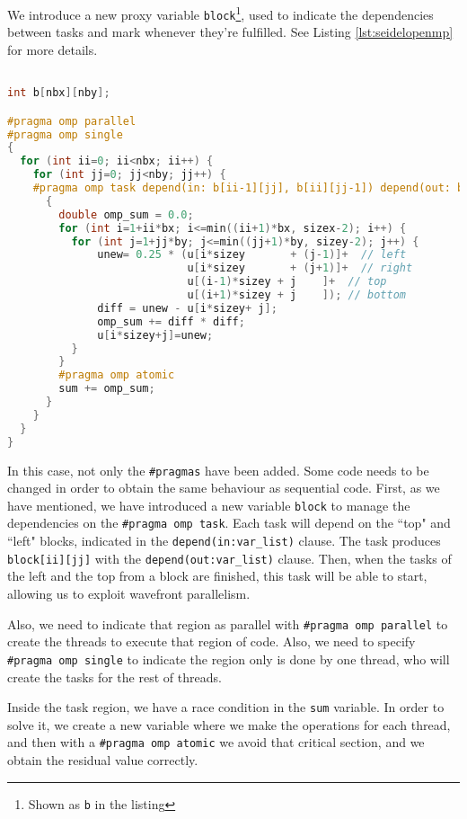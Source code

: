 \documentclass[a4paper, 10pt]{article}
\begin{document}
We introduce a new proxy variable \texttt{block}\footnote{Shown as \texttt{b} in the listing}, used to indicate the dependencies between tasks and mark whenever they're fulfilled. See Listing \ref{lst:seidelopenmp} for more details.

\begin{lstlisting}[language=c, caption={OpenMP pragma for Gauss-Seidel parallelization}, label={lst:seidelopenmp}]

int b[nbx][nby];

#pragma omp parallel
#pragma omp single
{
  for (int ii=0; ii<nbx; ii++) {
    for (int jj=0; jj<nby; jj++) {
    #pragma omp task depend(in: b[ii-1][jj], b[ii][jj-1]) depend(out: b[ii][jj]) private(diff, unew) 
      {
        double omp_sum = 0.0;
        for (int i=1+ii*bx; i<=min((ii+1)*bx, sizex-2); i++) {
          for (int j=1+jj*by; j<=min((jj+1)*by, sizey-2); j++) {
              unew= 0.25 * (u[i*sizey	    + (j-1)]+  // left
                            u[i*sizey	    + (j+1)]+  // right
                            u[(i-1)*sizey + j    ]+  // top
                            u[(i+1)*sizey + j    ]); // bottom
              diff = unew - u[i*sizey+ j];
              omp_sum += diff * diff; 
              u[i*sizey+j]=unew;
          } 
        }
        #pragma omp atomic
        sum += omp_sum;
      }
    }
  }
}
\end{lstlisting}

  In this case, not only the \texttt{\#pragmas} have been added. Some code needs to be changed in order to obtain the same behaviour as sequential code. First, as we have mentioned, we have introduced a new variable \texttt{block} to manage the dependencies on the \texttt{\#pragma omp task}. Each task will depend on the ``top" and ``left" blocks, indicated in the \texttt{depend(in:var\_list)} clause. The task produces \texttt{block[ii][jj]} with the \texttt{depend(out:var\_list)} clause. Then, when the tasks of the left and the top from a block are finished, this task will be able to start, allowing us to exploit wavefront parallelism.

  Also, we need to indicate that region as parallel with \texttt{\#pragma omp parallel} to create the threads to execute that region of code. Also, we need to specify \texttt{\#pragma omp single} to indicate the region only is done by one thread, who will create the tasks for the rest of threads. 

  Inside the task region, we have a race condition in the \texttt{sum} variable. In order to solve it, we create a new variable where we make the operations for each thread, and then with a \texttt{\#pragma omp atomic} we avoid that critical section, and we obtain the residual value correctly.
\end{document}
